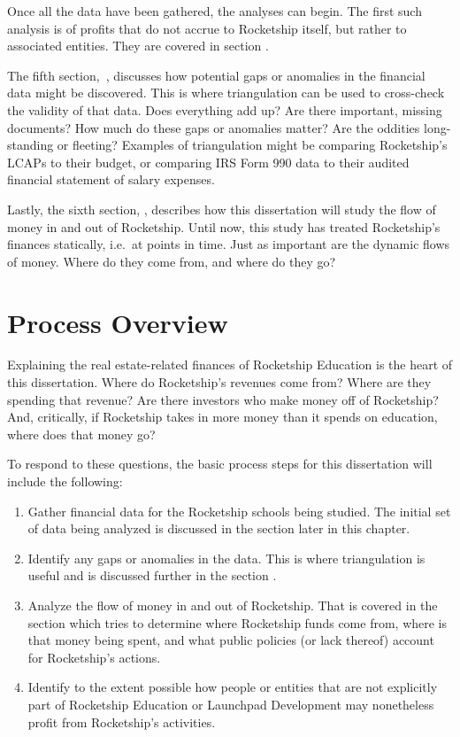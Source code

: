 Once all the data have been gathered, the analyses can begin.  The first such analysis is of profits that do not accrue to Rocketship itself, but rather to associated entities. They are covered in section \textit{}.

The fifth section,~\textit{}, discusses how potential gaps or anomalies in the financial data might be discovered. This is where triangulation can be used to cross-check the validity of that data. Does everything add up? Are there important, missing documents? How much do these gaps or anomalies matter? Are the oddities long-standing or fleeting? Examples of triangulation might be comparing Rocketship's LCAPs to their budget, or comparing IRS Form 990 data to their audited financial
statement of salary expenses.

Lastly, the sixth section, \textit{}, describes how this dissertation will study the flow of money in and out of Rocketship. Until now, this study has treated Rocketship's finances statically, i.e.~at points in time. Just as important are the dynamic flows of money. Where do they come from, and where do they go?

\section{Process Overview}\label{sec:process-overview}\indent

Explaining the real estate-related finances of Rocketship Education is the heart of this dissertation. Where do Rocketship's revenues come from? Where are they spending that revenue? Are there investors who make money off of Rocketship? And, critically, if Rocketship takes in more money than it spends on education, where does that money go?

To respond to these questions, the basic process steps for this dissertation will include the following:

\begin{enumerate}
  \item Gather financial data for the Rocketship schools being studied. The initial set of data being analyzed is discussed in the section \textit{} later in this chapter.
  \item Identify any gaps or anomalies in the data. This is where triangulation is useful and is discussed further in the section \textit{}. 
  \item Analyze the flow of money in and out of Rocketship. That  is covered in the section \textit{} which tries to determine where Rocketship funds come from, where is that money being spent, and what public policies (or lack thereof) account for Rocketship's actions.
  \item Identify to the extent possible how people or entities that are not explicitly part of Rocketship Education or Launchpad Development may nonetheless profit from Rocketship's activities. 
\end{enumerate}

